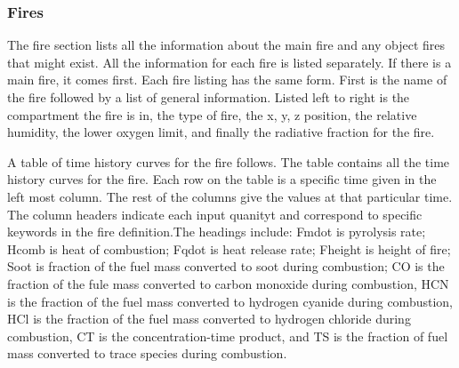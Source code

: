 \subsubsection{Fires}

The fire section lists all the information about the main fire and any object fires that might exist.  All the information for each fire is listed separately.  If there is a main fire, it comes first.  Each fire listing has the same form.  First is the name of the fire followed by a list of general information.  Listed left to right is the compartment the fire is in, the type of fire, the x, y, z position, the relative humidity, the lower oxygen limit, and finally the radiative fraction for the fire.

A table of time history curves for the fire follows.  The table contains all the time history curves for the fire.  Each row on the table is a specific time given in the left most column.  The rest of the columns give the values at that particular time.  The column headers indicate each input quanityt and correspond to specific keywords in the fire definition.The headings include: Fmdot is pyrolysis rate; Hcomb is heat of combustion; Fqdot is heat release rate; Fheight is height of fire; Soot is fraction of the fuel mass converted to soot during combustion; CO is the fraction of the fule mass converted to carbon monoxide during combustion, HCN is the fraction of the fuel mass converted to hydrogen cyanide during combustion, HCl is the fraction of the fuel mass converted to hydrogen chloride during combustion, CT is the concentration-time product, and TS is the fraction of fuel mass converted to trace species during combustion.

